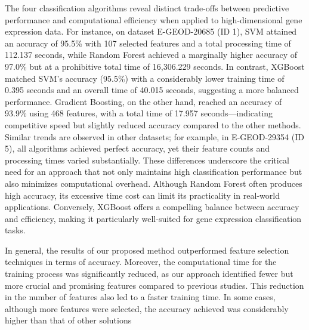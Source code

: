 The four classification algorithms reveal distinct trade-offs between predictive performance and computational efficiency when applied to high-dimensional gene expression data. For instance, on dataset E-GEOD-20685 (ID 1), SVM attained an accuracy of 95.5\% with 107 selected features and a total processing time of 112.137 seconds, while Random Forest achieved a marginally higher accuracy of 97.0\% but at a prohibitive total time of 16,306.229 seconds. In contrast, XGBoost matched SVM's accuracy (95.5\%) with a considerably lower training time of 0.395 seconds and an overall time of 40.015 seconds, suggesting a more balanced performance. Gradient Boosting, on the other hand, reached an accuracy of 93.9\% using 468 features, with a total time of 17.957 seconds—indicating competitive speed but slightly reduced accuracy compared to the other methods. Similar trends are observed in other datasets; for example, in E-GEOD-29354 (ID 5), all algorithms achieved perfect accuracy, yet their feature counts and processing times varied substantially. These differences underscore the critical need for an approach that not only maintains high classification performance but also minimizes computational overhead. Although Random Forest often produces high accuracy, its excessive time cost can limit its practicality in real-world applications. Conversely, XGBoost offers a compelling balance between accuracy and efficiency, making it particularly well-suited for gene expression classification tasks.

In general, the results of our proposed method outperformed feature selection techniques in terms of accuracy. Moreover, the computational time for the training process was significantly reduced, as our approach identified fewer but more crucial and promising features compared to previous studies. This reduction in the number of features also led to a faster training time. In some cases, although more features were selected, the accuracy achieved was considerably higher than that of other solutions






